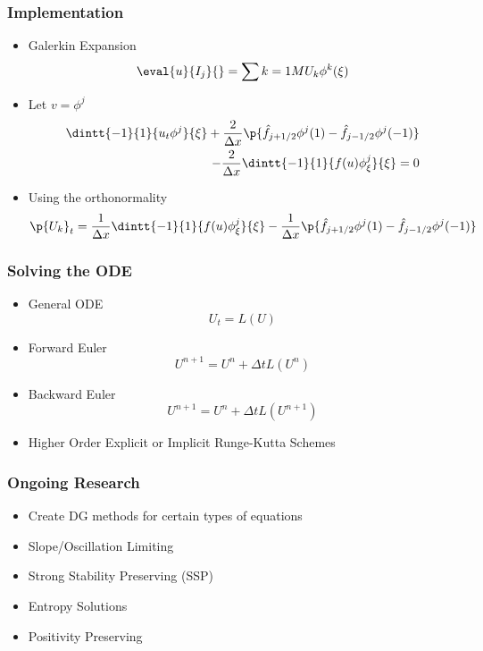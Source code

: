 \documentclass[10pt]{beamer}
\begin{document}
  \begin{frame}
    \frametitle{Implementation}
    \begin{itemize}
      \item Galerkin Expansion
        \[
          \eval{u}{I_j}{} = \sum{k = 1}{M}{U_k \phi^k(\xi)}
        \]

      \item Let $v = \phi^j$
        \begin{align*}
          \dintt{-1}{1}{u_t \phi^j}{\xi} + \frac{2}{\Delta x}\p{\hat{f}_{j+1/2} \phi^j(1) - \hat{f}_{j-1/2} \phi^j(-1)} \\
          - \frac{2}{\Delta x}\dintt{-1}{1}{f(u) \phi^j_{\xi}}{\xi} = 0
        \end{align*}
      \item Using the orthonormality
        \begin{align*}
          \p{U_k}_t = \frac{1}{\Delta x}\dintt{-1}{1}{f(u) \phi^j_{\xi}}{\xi} - \frac{1}{\Delta x}\p{\hat{f}_{j+1/2} \phi^j(1) - \hat{f}_{j-1/2} \phi^j(-1)}
        \end{align*}
    \end{itemize}
  \end{frame}

  \begin{frame}
    \frametitle{Solving the ODE}

    \begin{itemize}
      \item General ODE
        \[
          U_t = L(U)
        \]

      \item Forward Euler
        \[
          U^{n+1} = U^n + \Delta t L(U^n)
        \]

      \item Backward Euler
        \[
          U^{n+1} = U^n + \Delta t L(U^{n+1})
        \]

      \item Higher Order Explicit or Implicit Runge-Kutta Schemes
    \end{itemize}
  \end{frame}

  \begin{frame}
    \frametitle{Ongoing Research}
    \begin{itemize}
      \item Create DG methods for certain types of equations
      \item Slope/Oscillation Limiting
      \item Strong Stability Preserving (SSP)
      \item Entropy Solutions
      \item Positivity Preserving
    \end{itemize}
  \end{frame}
\end{document}
